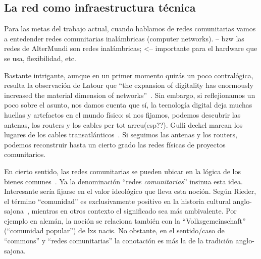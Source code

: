 \subsection{La red como infraestructura técnica}
Para las metas del trabajo actual, cuando hablamos de redes comunitarias vamos a entedender redes comunitarias inalámbricas (computer networks).
-- bzw las redes de AlterMundi son redes inalámbricas; <-- importante para el hardware que se usa, flexibilidad, etc.



Bastante intrigante, aunque en un primer momento quizás un poco contralógica, resulta la observación de Latour que ``the expansion of digitality has enormously increased the material dimension of networks''~\autocite{Latour2010}.
Sin embargo, si reflejionamos un poco sobre el asunto, nos damos cuenta que sí, la tecnología digital deja muchas huellas y artefactos en el mundo físico: si nos fijamos, podemos descubrir las antenas, los routers y los cables per tot arreu(esp??).
Gulli deckel marcan los lugares de los cables transatlánticos~\autocite{video-internet-landscapes}.
Si seguimos las antenas y los routers, podemos reconstruir hasta un cierto grado las redes físicas de proyectos comunitarios.

En cierto sentido, las redes comunitarias se pueden ubicar en la lógica de los bienes comunes~\autocite{FiTre2015}.
Ya la denominación ``redes \textit{comunitarias}'' insinua esta idea.
Interesante sería fijarse en el valor ideológico que lleva esta noción.
Según Rieder, el término ``comunidad'' es exclusivamente positivo en la historia cultural anglo-sajona~\autocite{Rieder2012}, mientras en otros contexto el significado sea más ambivalente.
Por ejemplo en alemán, la noción se relaciona también con la ``Volksgemeinschaft'' (``comunidad popular'') de lxs nacis. %
No obstante, en el sentido/caso de ``commons'' y ``redes comunitarias'' la conotación es más la de la tradición anglo-sajona.

